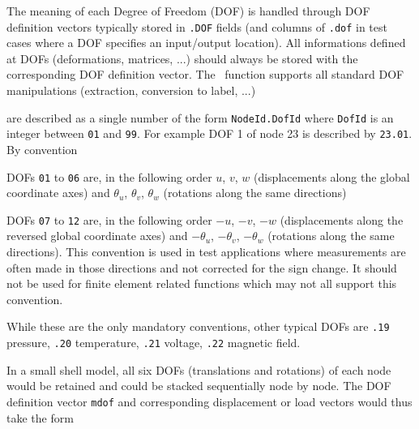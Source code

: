 %

The meaning of each Degree of Freedom (DOF) is handled through DOF definition vectors typically stored in {\tt .DOF} fields (and columns of {\tt .dof} in test cases where a DOF specifies an input/output location). All informations defined at DOFs (deformations, matrices, ...) should always be stored with the corresponding DOF definition vector. The \fec\ function supports all standard DOF manipulations (extraction, conversion to label, ...)

 are described as a single number of the form {\tt NodeId.DofId} where {\tt DofId} is an integer between {\tt 01} and {\tt 99}.  For example DOF 1 of node 23 is described by {\tt 23.01}. By convention

\begin{Eitem}
%
\item DOFs {\tt 01} to {\tt 06} are, in the following order $u$, $v$, $w$ (displacements along the global coordinate axes) and $\theta_{u}$, $\theta_{v}$, $\theta_{w}$ (rotations along the same directions)

\item DOFs {\tt 07} to {\tt 12} are, in the following order $-u$, $-v$, $-w$ (displacements along the reversed global coordinate axes) and $-\theta_{u}$, $-\theta_{v}$, $-\theta_{w}$ (rotations along the same directions). This convention is used in test applications where measurements are often made in those directions and not corrected for the sign change. 
It should not be used for finite element related functions which may not all support this convention.

\end{Eitem}

While these are the only mandatory conventions, other typical DOFs are {\tt .19} pressure, {\tt .20} temperature, {\tt .21} voltage, {\tt .22} magnetic field.

In a small shell model, all six DOFs (translations and rotations) of each node would be retained and could be stacked sequentially node by node.  The DOF definition vector {\tt mdof} and corresponding displacement or load vectors would thus take the form


